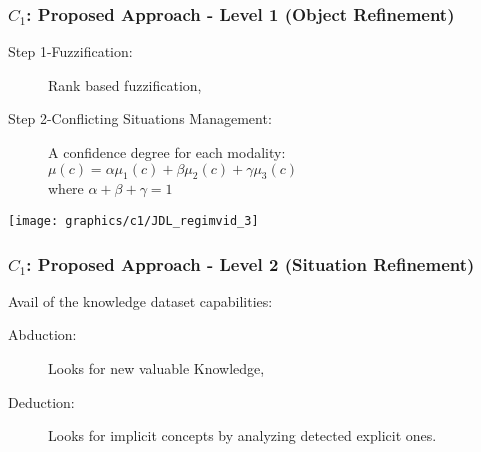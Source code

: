 \begin{frame}
	\frametitle{$C_{1}$: Proposed Approach - Level 1 (Object Refinement)}
	\small
	\begin{block}{}
		\begin{description}
			\item[Step 1-Fuzzification:] Rank based fuzzification,
			\item[Step 2-Conflicting Situations Management:]
			       A confidence degree for each modality:
			       $\mu(c) = \alpha \mu_{1}(c) +  \beta \mu_{2}(c) +  \gamma \mu_{3}(c)$ \\where $\alpha + \beta + \gamma= 1$
		\end{description}
	\end{block}
	{\centering\texttt{[image: graphics/c1/JDL\_regimvid\_3]}}
\end{frame}

\begin{frame}
	\frametitle{$C_{1}$: Proposed Approach - Level 2 (Situation Refinement)}
	\small
	\begin{block}{}
		Avail of the knowledge dataset capabilities:
		\begin{description}
			\item[Abduction:] Looks for new valuable Knowledge,
			\item[Deduction:] Looks for implicit concepts by analyzing detected explicit ones.
		\end{description}
	\end{block}
\end{frame}


